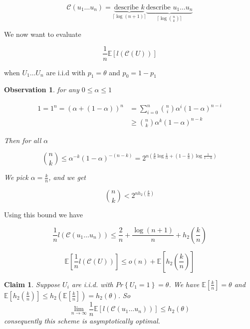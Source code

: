 \documentclass[twoside]{article}
\newtheorem{claim}{Claim}[section]
\newtheorem{observation}{Observation}[section]
\theoremstyle{definition} %
\renewcommand{\Pr}[1]{Pr\left\{#1\right\}}
\newcommand{\Ex}[1]{\mathbb{E}\left[#1\right]}
\newcommand{\pfrac}[2]{\left( \frac{#1}{#2} \right)}
\def\C{\mathcal{C}}
\begin{document}
\[
  \C(u_1 \dots u_n) =
  \underbrace{\text{describe } k}_{\lceil \log (n+1)\rceil}
  \underbrace{\text{describe } u_1 \dots u_n}_{\lceil \log {n \choose k}\rceil}
\]

We now want to evaluate

\[
  \frac 1 n \Ex{l(\C(U))}
\]

when $U_1 \dots U_n$ are i.i.d with $p_1 = \theta$ and $p_0 = 1 - p_1$

\begin{observation}

for any $0 \leq \alpha \leq 1$

\begin{align*}
  1 = 1^n = (\alpha + (1-\alpha))^n &= \sum_{i=0}^n {n \choose i} \alpha^i (1-\alpha)^{n-i}\\
  & \geq {n \choose k} \alpha^k (1-\alpha)^{n-k}
\end{align*}

Then for all $\alpha$

\[
{n \choose k} \leq \alpha^{-k}(1-\alpha)^{-(n-k)} = 2^{n(\frac k n \log \frac 1 \alpha + (1-\frac k n) \log \frac 1 {1-\alpha})}
\]

We pick $\alpha = \frac k n$, and we get

\[
  {n \choose k} < 2^{n h_2 \pfrac k n}
\]

\end{observation}

Using this bound we have

\[
  \frac 1 n l(\C(u_1 \dots u_n)) \leq \frac 2 n + \frac {\log (n+1)} n + h_2\pfrac k n
\]

\[
  \Ex{\frac 1 n l(\C(U))} \leq o(n) + \Ex{h_2 \pfrac k n}
\]

\begin{claim}
Suppose $U_i$ are i.i.d. with $\Pr{U_1=1}=\theta$. We have $\Ex{ \frac k n} = \theta$ and $\Ex{h_2 \pfrac k n } \leq h_2(\Ex{\frac k n}) = h_2(\theta)$. So
\[
  \lim_{n\to \infty} \frac 1 n \Ex{l(\C(u_1\dots u_n))} \leq h_2(\theta)
\]
consequently this scheme is asymptotically optimal.
\end{claim}
\end{document}
